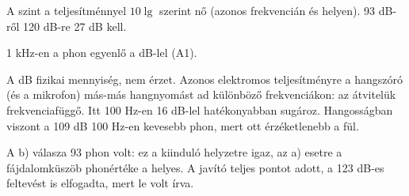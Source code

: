 A szint a teljesítménnyel $10\lg$ szerint nő (azonos frekvencián és helyen). 93 dB-ről 120 dB-re 27 dB kell.

\begin{center}\end{center}

1 kHz-en a phon egyenlő a dB-lel (A1).

\begin{center}\end{center}

A dB fizikai mennyiség, nem érzet. Azonos elektromos teljesítményre a hangszóró (és a mikrofon) más-más hangnyomást ad különböző frekvenciákon: az átvitelük frekvenciafüggő. Itt 100 Hz-en 16 dB-lel hatékonyabban sugároz. Hangosságban viszont a 109 dB 100 Hz-en kevesebb phon, mert ott érzéketlenebb a fül.
\begin{figyelem}[Javítás]
A b) válasza 93 phon volt: ez a kiinduló helyzetre igaz, az a) esetre a fájdalomküszöb phonértéke a helyes. A javító teljes pontot adott, a 123 dB-es feltevést is elfogadta, mert le volt írva.
\end{figyelem}
\begin{eredmeny}

\begin{center}\end{center}
\end{eredmeny}


